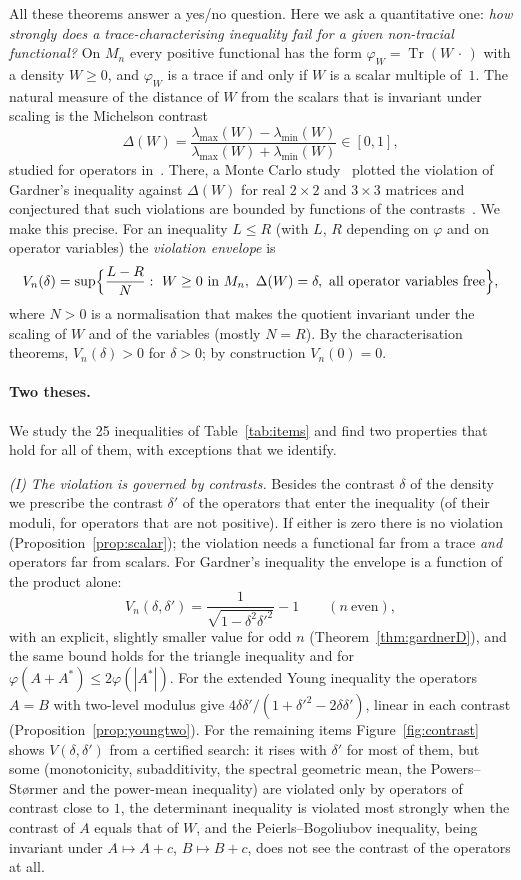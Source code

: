 \documentclass[11pt]{article}
\DeclareMathOperator{\Tr}{Tr}
\theoremstyle{plain}
\theoremstyle{definition}
\theoremstyle{remark}
\begin{document}
All these theorems answer a yes/no question. Here we ask a quantitative one: \emph{how strongly does a
trace-characterising inequality fail for a given non-tracial functional?} On $M_n$ every positive functional has the
form $\varphi_W=\Tr(W\,\cdot\,)$ with a density $W\ge0$, and $\varphi_W$ is a trace if and only if $W$ is a scalar
multiple of~$1$. The natural measure of the distance of $W$ from the scalars that is invariant under scaling is the
Michelson contrast
\[
  \Delta(W)=\frac{\lambda_{\max}(W)-\lambda_{\min}(W)}{\lambda_{\max}(W)+\lambda_{\min}(W)}\in[0,1],
\]
studied for operators in~\cite{abed2024}. There, a Monte Carlo study~\cite[Sect.~5.1, Fig.~1]{abed2024} plotted the
violation of Gardner's inequality against $\Delta(W)$ for real $2\times2$ and $3\times3$ matrices and conjectured
that such violations are bounded by functions of the contrasts~\cite[Sect.~7]{abed2024}. We make this precise. For an
inequality $L\le R$ (with $L$, $R$ depending on $\varphi$ and on operator variables) the \emph{violation envelope} is
\[
  V_n(\delta)=\sup\Bigl\{\frac{L-R}{N}:\ W\ge0\ \text{in}\ M_n,\ \Delta(W)=\delta,\ \text{all operator variables
  free}\Bigr\},
\]
where $N>0$ is a normalisation that makes the quotient invariant under the scaling of $W$ and of the variables
(mostly $N=R$). By the characterisation theorems, $V_n(\delta)>0$ for $\delta>0$; by construction $V_n(0)=0$.

\paragraph{Two theses.} We study the 25 inequalities of Table~\ref{tab:items} and find two properties that hold for
all of them, with exceptions that we identify.

\emph{(I) The violation is governed by contrasts.} Besides the contrast $\delta$ of the density we prescribe the
contrast $\delta'$ of the operators that enter the inequality (of their moduli, for operators that are not positive).
If either is zero there is no violation (Proposition~\ref{prop:scalar}); the violation needs a functional far from a
trace \emph{and} operators far from scalars. For Gardner's inequality the envelope is a function of the product
alone:
\[
  V_n(\delta,\delta')=\frac{1}{\sqrt{1-\delta^2\delta'^2}}-1\qquad(n\ \text{even}),
\]
with an explicit, slightly smaller value for odd $n$ (Theorem~\ref{thm:gardnerD}), and the same bound holds for the
triangle inequality and for $\varphi(A+A^*)\le2\varphi(|A^*|)$. For the extended Young inequality the operators $A=B$
with two-level modulus give $4\delta\delta'/(1+\delta'^2-2\delta\delta')$, linear in each contrast
(Proposition~\ref{prop:youngtwo}). For the remaining items Figure~\ref{fig:contrast} shows $V(\delta,\delta')$ from a
certified search: it rises with $\delta'$ for most of them, but some (monotonicity, subadditivity, the spectral geometric
mean, the Powers--St{\o}rmer and the power-mean inequality) are violated only by operators of contrast close to $1$, the
determinant inequality is violated most strongly when the contrast of $A$ equals that of $W$, and the
Peierls--Bogoliubov inequality, being invariant under $A\mapsto A+c$, $B\mapsto B+c$, does not see the contrast of the
operators at all.
\end{document}
